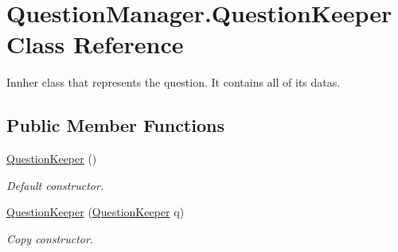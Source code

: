 \hypertarget{class_question_manager_1_1_question_keeper}{\section{Question\-Manager.\-Question\-Keeper Class Reference}
\label{class_question_manager_1_1_question_keeper}
}


Innher class that represents the question. It contains all of its datas.  


\subsection*{Public Member Functions}
\begin{DoxyCompactItemize}
\item 
\hyperlink{class_question_manager_1_1_question_keeper_ae61431c3b997d269db9e0b2d3ae7f744}{Question\-Keeper} ()
\begin{DoxyCompactList}\small\item\em Default constructor. \end{DoxyCompactList}\item 
\hyperlink{class_question_manager_1_1_question_keeper_a5d273f28f298b0f487b0e56b8723cf10}{Question\-Keeper} (\hyperlink{class_question_manager_1_1_question_keeper}{Question\-Keeper} q)
\begin{DoxyCompactList}\small\item\em Copy constructor. \end{DoxyCompactList}\end{DoxyCompactItemize}
